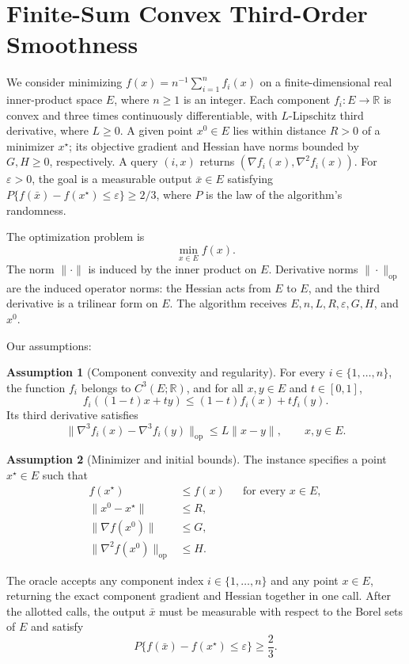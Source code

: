 \documentclass[10pt]{article}
\theoremstyle{definition}
\newtheorem{assumption}{Assumption}
\begin{document}
\section*{Finite-Sum Convex Third-Order Smoothness}
We consider minimizing $f(x)=n^{-1}\sum_{i=1}^n f_i(x)$ on a finite-dimensional real inner-product space $E$, where $n\geq1$ is an integer. Each component $f_i:E\to\mathbb{R}$ is convex and three times continuously differentiable, with $L$-Lipschitz third derivative, where $L\geq0$. A given point $x^0\in E$ lies within distance $R>0$ of a minimizer $x^\star$; its objective gradient and Hessian have norms bounded by $G,H\geq0$, respectively. A query $(i,x)$ returns $(\nabla f_i(x),\nabla^2 f_i(x))$. For $\varepsilon>0$, the goal is a measurable output $\bar{x}\in E$ satisfying $P\{f(\bar{x})-f(x^\star)\leq\varepsilon\}\geq2/3$, where $P$ is the law of the algorithm's randomness.

The optimization problem is
\[
\min_{x\in E} f(x).
\]
The norm $\|\cdot\|$ is induced by the inner product on $E$. Derivative norms $\|\cdot\|_{\mathrm{op}}$ are the induced operator norms: the Hessian acts from $E$ to $E$, and the third derivative is a trilinear form on $E$. The algorithm receives $E,n,L,R,\varepsilon,G,H$, and $x^0$.

Our assumptions:
\begin{assumption}[Component convexity and regularity]
For every $i\in\{1,\ldots,n\}$, the function $f_i$ belongs to $C^3(E;\mathbb{R})$, and for all $x,y\in E$ and $t\in[0,1]$,
\[
f_i((1-t)x+ty)\leq(1-t)f_i(x)+t f_i(y).
\]
Its third derivative satisfies
\[
\|\nabla^3 f_i(x)-\nabla^3 f_i(y)\|_{\mathrm{op}}
\leq L\|x-y\|,
\qquad x,y\in E.
\]
\end{assumption}

\begin{assumption}[Minimizer and initial bounds]
The instance specifies a point $x^\star\in E$ such that
\[
\begin{aligned}
f(x^\star)&\leq f(x) &&\text{for every }x\in E,\\
\|x^0-x^\star\|&\leq R,\\
\|\nabla f(x^0)\|&\leq G,\\
\|\nabla^2 f(x^0)\|_{\mathrm{op}}&\leq H.
\end{aligned}
\]
\end{assumption}

The oracle accepts any component index $i\in\{1,\ldots,n\}$ and any point $x\in E$, returning the exact component gradient and Hessian together in one call. After the allotted calls, the output $\bar{x}$ must be measurable with respect to the Borel sets of $E$ and satisfy
\[
P\bigl\{f(\bar{x})-f(x^\star)\leq\varepsilon\bigr\}
\geq \frac{2}{3}.
\]
\end{document}
